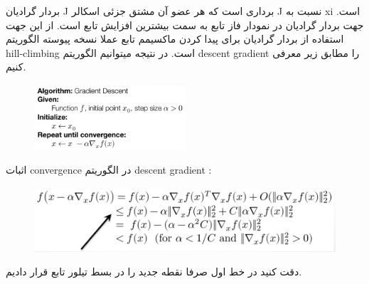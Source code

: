 بردار گرادیان J برداری است که هر عضو آن مشتق جزئی اسکالر J نسبت به xi است.
جهت بردار گرادیان در نمودار فاز تابع به سمت بیشترین افزایش تابع است.
از این جهت استفاده از بردار گرادیان برای پیدا کردن ماکسیمم تابع عملا نسخه پیوسته الگوریتم hill-climbing است.
 در نتیجه میتوانیم الگوریتم descent gradient را مطابق زیر معرفی کنیم.

\begin{figure}[H]
    \centering
    \includegraphics[width=0.5\textwidth]{source/gradient-descent.png}
    \label{fig:descent-gradient}
\end{figure}

اثبات convergence در الگوریتم descent gradient :

\begin{figure}[H]
    \centering
    \includegraphics[width=\textwidth]{source/gradient-descent-proof.png}
    \label{fig:descent-gradient-proof}
\end{figure}

دقت کنید در خط اول صرفا نقطه جدید را در بسط تیلور تابع قرار دادیم.